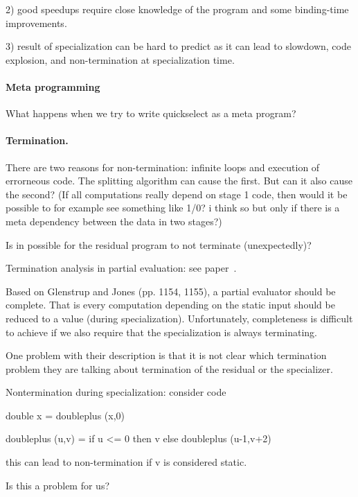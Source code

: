 2) good speedups require close knowledge of the program and some
binding-time improvements.

3) result of specialization can be hard to predict as it can lead to
slowdown, code explosion, and non-termination at specialization time.


\paragraph{Meta programming}

What happens when we try to write quickselect as a meta program? 


\paragraph{Termination.}

There are two reasons for non-termination: infinite loops and
execution of errorneous code.  The splitting algorithm can cause the
first.  But can it also cause the second? (If all computations really
depend on stage 1 code, then would it be possible to for example see
something like 1/0?  i think so but only if there is a meta dependency
between the data in two stages?)


Is in possible for the residual program to not terminate (unexpectedly)? 

Termination analysis in partial evaluation: see paper~\cite{AH96,GJ05}.

Based on Glenstrup and Jones (pp. 1154, 1155), a partial evaluator
should be complete. That is every computation depending on the static
input should be reduced to a value (during specialization).
Unfortunately, completeness is difficult to achieve if we also require
that the specialization is always terminating.

One problem with their description is that it is not clear which
termination problem they are talking about termination of the residual
or the specializer. 

Nontermination during specialization: 
consider code

double x = doubleplus (x,0) 

doubleplus (u,v) = if u <= 0 then v else doubleplus (u-1,v+2)

this can lead to non-termination if v is considered static.  

Is this a problem for us? 



